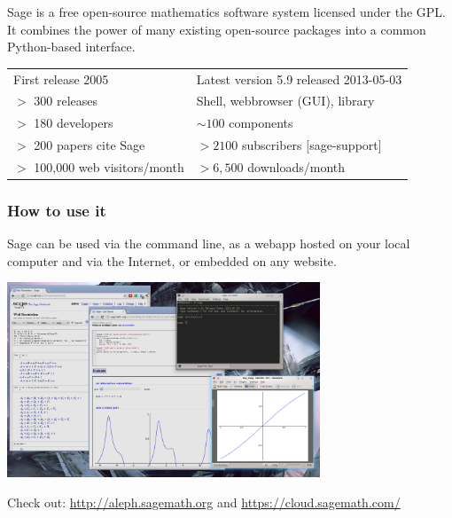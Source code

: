 \documentclass[9pt]{beamer}
\begin{document}
\begin{frame}
\vspace{1em}

Sage is a free open-source mathematics software system licensed under the GPL. It combines the power of many existing open-source packages into a common Python-based interface.

\vspace{1em}

\begin{tabular}{ll}
First release 2005 & Latest version 5.9 released 2013-05-03\\
$>$ 300 releases  & Shell, webbrowser (GUI), library\\
$>$ 180 developers  & $\sim 100$ components\\
$>$ 200 papers cite Sage & $> 2100$ subscribers [sage-support]\\
$>$ 100,000 web visitors/month&  $> 6,500$ downloads/month\\
\end{tabular}
\end{frame}

\begin{frame}
\frametitle{How to use it}
Sage can be used via the command line, as a webapp hosted on your local computer and via the Internet, or embedded on any website.

\begin{center}
\includegraphics[width=0.7\textwidth]{sage-desktop.png}
\end{center}
\vspace{-0.5em}
\begin{block}{}
Check out: \url{http://aleph.sagemath.org} and \url{https://cloud.sagemath.com/}
\end{block}
\end{frame}
\end{document}
